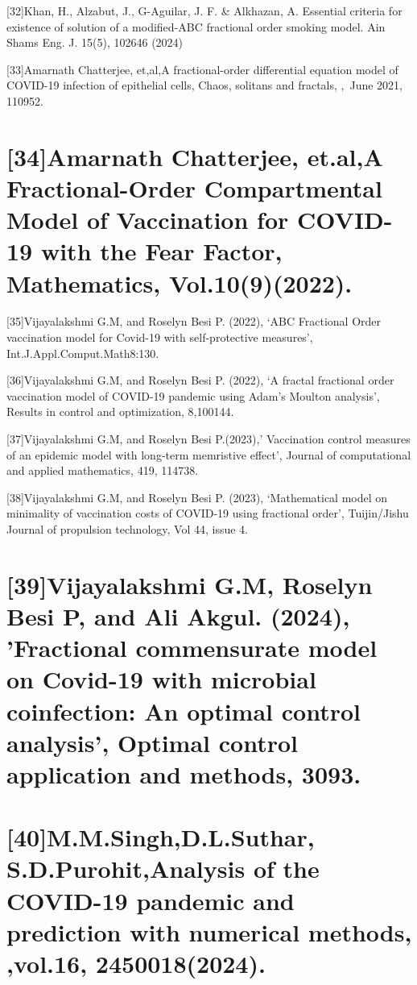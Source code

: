 \documentclass[10pt]{NSP1}
\begin{document}
[32]Khan, H., Alzabut, J., G-Aguilar, J. F. \& Alkhazan, A. Essential criteria for existence of solution of a modified-ABC fractional order smoking model. Ain Shams Eng. J. 15(5), 102646 (2024)

[33]Amarnath Chatterjee, et,al,A fractional-order differential equation model of COVID-19 infection of epithelial cells, Chaos, solitans and fractals, , June 2021, 110952.

\section*{}

\section*{[34]Amarnath Chatterjee, et.al,A Fractional-Order Compartmental Model of Vaccination for COVID-19 with the Fear Factor, Mathematics, Vol.10(9)(2022).}

[35]Vijayalakshmi G.M, and Roselyn Besi P. (2022), ‘ABC Fractional Order vaccination model for Covid-19 with self-protective measures’, Int.J.Appl.Comput.Math8:130.

[36]Vijayalakshmi G.M, and Roselyn Besi P. (2022), ‘A fractal fractional order vaccination model of COVID-19 pandemic using Adam’s Moulton analysis’, Results in control and optimization, 8,100144.

[37]Vijayalakshmi G.M, and Roselyn Besi P.(2023),’ Vaccination control measures of an epidemic model with long-term memristive effect’, Journal of computational and applied mathematics, 419, 114738.

[38]Vijayalakshmi G.M, and Roselyn Besi P. (2023), ‘Mathematical model on minimality of vaccination costs of COVID-19 using fractional order’, Tuijin/Jishu Journal of propulsion technology, Vol 44, issue 4.

\section*{[39]Vijayalakshmi G.M, Roselyn Besi P, and Ali Akgul. (2024), ’Fractional commensurate model on Covid-19 with microbial coinfection: An optimal control analysis’, Optimal control application and methods, 3093.}

\section*{[40]M.M.Singh,D.L.Suthar, S.D.Purohit,Analysis of the COVID-19 pandemic and prediction with numerical methods, ,vol.16, 2450018(2024).}
\end{document}
